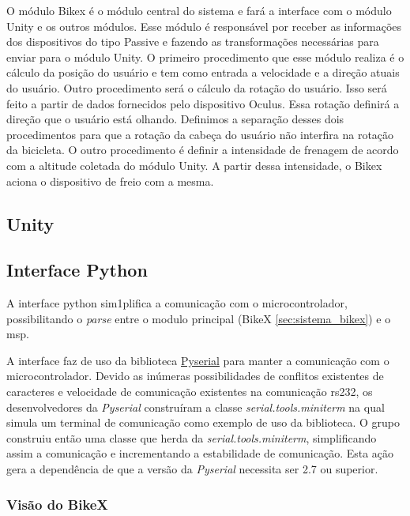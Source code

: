 O módulo Bikex é o módulo central do sistema e fará a interface com o módulo Unity e os outros módulos. Esse módulo é responsável por receber as informações dos dispositivos do tipo Passive e fazendo as transformações necessárias para enviar para o módulo Unity. O primeiro procedimento que esse módulo realiza é o cálculo da posição do usuário e tem como entrada a velocidade e a direção atuais do usuário. Outro procedimento será o cálculo da rotação do usuário. Isso será feito a partir de dados fornecidos pelo dispositivo Oculus. Essa rotação definirá a direção que o usuário está olhando. Definimos a separação desses dois procedimentos para que a rotação da cabeça do usuário não interfira na rotação da bicicleta. O outro procedimento é definir a intensidade de frenagem de acordo com a altitude coletada do módulo Unity. A partir dessa intensidade, o Bikex aciona o dispositivo de freio com a mesma.



\subsection{Unity}

\subsection{Interface Python} %
\label{sec:interface_python}

A interface \gls{python} sim1plifica a comunicação com o microcontrolador, possibilitando o \textit{parse} entre o modulo principal (BikeX \ref{sec:sistema_bikex}) e o \gls{msp}.

A interface faz de uso da biblioteca \href{http://pyserial.sourceforge.net/pyserial.html}{Pyserial} para manter a comunicação com o microcontrolador. Devido as inúmeras possibilidades de conflitos existentes de caracteres e velocidade de comunicação existentes na comunicação \gls{rs232}, os desenvolvedores da \textit{Pyserial} construíram a classe \textit{serial.tools.miniterm} na qual simula um terminal de comunicação como exemplo de uso da biblioteca. O grupo construiu então uma classe que herda da \textit{serial.tools.miniterm}, simplificando assim a comunicação e incrementando a estabilidade de comunicação. Esta ação gera a dependência de que a versão da \textit{Pyserial} necessita ser 2.7 ou superior.

\subsubsection{Visão do BikeX} %
\label{sub:vis_o_do_bikex}

